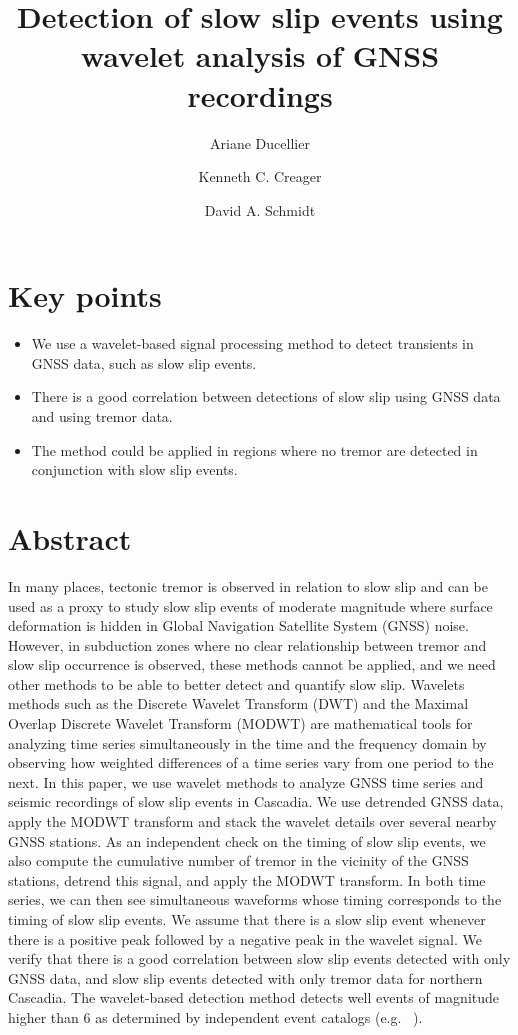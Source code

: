 \documentclass{article}
\title{Detection of slow slip events using wavelet analysis of GNSS recordings}
\author[1]{Ariane Ducellier}
\author[1]{Kenneth C. Creager}
\author[1]{David A. Schmidt}
\affil[1]{University of Washington, Department of Earth and Space Sciences, Box 351310, 4000 15th Avenue NE Seattle, WA 98195-1310}
\date{}
\begin{document}
\maketitle

\section*{Key points}

\begin{itemize}
\item We use a wavelet-based signal processing method to detect transients in GNSS data, such as slow slip events.
\item There is a good correlation between detections of slow slip using GNSS data and using tremor data.
\item The method could be applied in regions where no tremor are detected in conjunction with slow slip events.
\end{itemize}

\newpage

\section*{Abstract}

In many places, tectonic tremor is observed in relation to slow slip and can be used as a proxy to study slow slip events of moderate magnitude where surface deformation is hidden in Global Navigation Satellite System (GNSS) noise. However, in subduction zones where no clear relationship between tremor and slow slip occurrence is observed, these methods cannot be applied, and we need other methods to be able to better detect and quantify slow slip. Wavelets methods such as the Discrete Wavelet Transform (DWT) and the Maximal Overlap Discrete Wavelet Transform (MODWT) are mathematical tools for analyzing time series simultaneously in the time and the frequency domain by observing how weighted differences of a time series vary from one period to the next. In this paper, we use wavelet methods to analyze GNSS time series and seismic recordings of slow slip events in Cascadia. We use detrended GNSS data, apply the MODWT transform and stack the wavelet details over several nearby GNSS stations. As an independent check on the timing of slow slip events, we also compute the cumulative number of tremor in the vicinity of the GNSS stations, detrend this signal, and apply the MODWT transform. In both time series, we can then see simultaneous waveforms whose timing corresponds to the timing of slow slip events. We assume that there is a slow slip event whenever there is a positive peak followed by a negative peak in the wavelet signal. We verify that there is a good correlation between slow slip events detected with only GNSS data, and slow slip events detected with only tremor data for northern Cascadia. The wavelet-based detection method detects well events of magnitude higher than 6 as determined by independent event catalogs (e.g. ~\citep{MIC_2019}).
\end{document}
